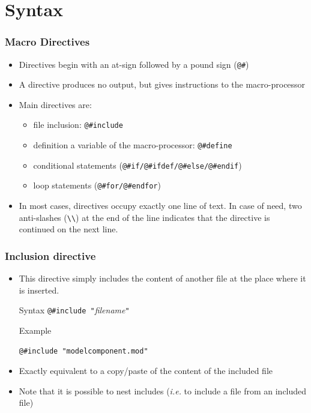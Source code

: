 \documentclass{beamer}
\begin{document}
\section{Syntax}

\begin{frame}[fragile=singleslide]
  \frametitle{Macro Directives}
  \begin{itemize}
  \item Directives begin with an at-sign followed by a pound sign (\verb+@#+)
  \item A directive produces no output, but gives instructions to the macro-processor
  \item Main directives are:
    \begin{itemize}
    \item file inclusion: \verb+@#include+
    \item definition a variable of the macro-processor: \verb+@#define+
    \item conditional statements (\verb+@#if/@#ifdef/@#else/@#endif+)
    \item loop statements (\verb+@#for/@#endfor+)
    \end{itemize}
  \item In most cases, directives occupy exactly one line of text. In case of need, two anti-slashes (\verb+\\+) at the end of the line indicates that the directive is continued on the next line.
  \end{itemize}
\end{frame}

\begin{frame}[fragile=singleslide]
  \frametitle{Inclusion directive}
  \begin{itemize}
  \item This directive simply includes the content of another file at the place where it is inserted.
    \begin{block}{Syntax}
      \verb+@#include "+\textit{filename}\verb+"+
    \end{block}
    \begin{block}{Example}
\begin{verbatim}
@#include "modelcomponent.mod"
\end{verbatim}
    \end{block}
  \item Exactly equivalent to a copy/paste of the content of the included file
  \item Note that it is possible to nest includes (\textit{i.e.} to include a file from an included file)
  \end{itemize}
\end{frame}
\end{document}
